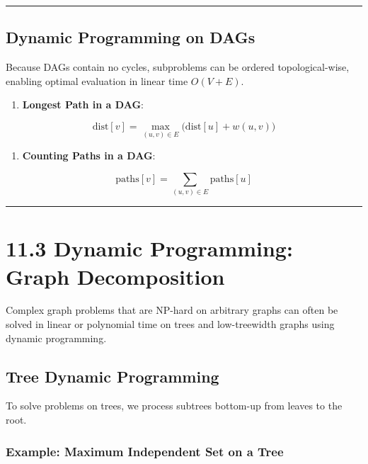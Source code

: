 \documentclass[
]{book}
\providecommand{\tightlist}{%
  \setlength{\itemsep}{0pt}\setlength{\parskip}{0pt}}
\theoremstyle{definition}
\theoremstyle{definition}
\theoremstyle{definition}
\theoremstyle{definition}
\theoremstyle{remark}
\begin{document}
\begin{center}\rule{0.5\linewidth}{0.5pt}\end{center}

\subsection{Dynamic Programming on DAGs}\label{dynamic-programming-on-dags}

Because DAGs contain no cycles, subproblems can be ordered topological-wise, enabling optimal evaluation in linear time \(O(V + E)\).

\begin{enumerate}
\def\labelenumi{\arabic{enumi}.}
\tightlist
\item
  \textbf{Longest Path in a DAG}:
\end{enumerate}

\[\text{dist}[v] = \max_{(u, v) \in E} \big( \text{dist}[u] + w(u, v) \big)\]

\begin{enumerate}
\def\labelenumi{\arabic{enumi}.}
\setcounter{enumi}{1}
\tightlist
\item
  \textbf{Counting Paths in a DAG}:
\end{enumerate}

\[\text{paths}[v] = \sum_{(u, v) \in E} \text{paths}[u]\]

\begin{center}\rule{0.5\linewidth}{0.5pt}\end{center}

\section{11.3 Dynamic Programming: Graph Decomposition}\label{dynamic-programming-graph-decomposition}

Complex graph problems that are NP-hard on arbitrary graphs can often be solved in linear or polynomial time on trees and low-treewidth graphs using dynamic programming.

\subsection{Tree Dynamic Programming}\label{tree-dynamic-programming}

To solve problems on trees, we process subtrees bottom-up from leaves to the root.

\subsubsection{Example: Maximum Independent Set on a Tree}\label{example-maximum-independent-set-on-a-tree}
\end{document}
